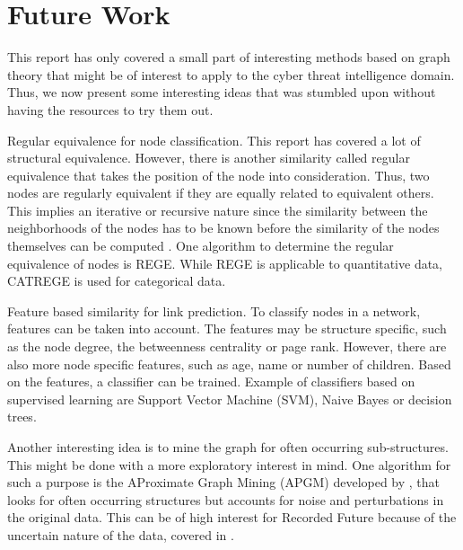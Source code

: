 \section{Future Work}
This report has only covered a small part of interesting methods based on graph theory that might be of interest to apply to the cyber threat intelligence domain. Thus, we now present some interesting ideas that was stumbled upon without having the resources to try them out. 

Regular equivalence for node classification. This report has covered a lot of structural equivalence. However, there is another similarity called regular equivalence that takes the position of the node into consideration. Thus, two nodes are regularly equivalent if they are equally related to equivalent others. This implies an iterative or recursive nature since the similarity between the neighborhoods of the nodes has to be known before the similarity of the nodes themselves can be computed \cite{leicht2006}. One algorithm to determine the regular equivalence of nodes is REGE. While REGE is applicable to quantitative data, CATREGE is used for categorical data. 

Feature based similarity for link prediction. To classify nodes in a network, features can be taken into account. The features may be structure specific, such as the node degree, the betweenness centrality or page rank. However, there are also more node specific features, such as age, name or number of children. Based on the features, a classifier can be trained. Example of classifiers based on supervised learning are Support Vector Machine (SVM), Naive Bayes or decision trees.

Another interesting idea is to mine the graph for often occurring sub-structures. This might be done with a more exploratory interest in mind. One algorithm for such a purpose is the AProximate Graph Mining (APGM) developed by \citet{Jia2011}, that looks for often occurring structures but accounts for noise and perturbations in the original data. This can be of high interest for Recorded Future because of the uncertain nature of the data, covered in .